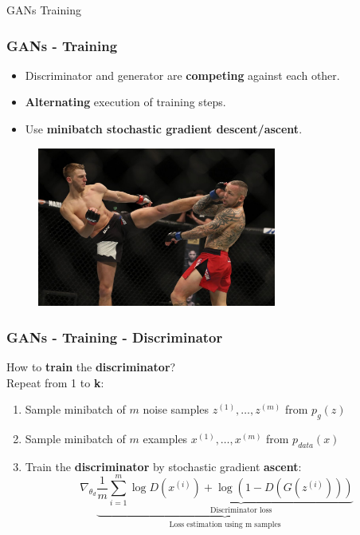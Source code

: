 \documentclass{beamer}
\begin{document}
\begin{frame}[standout]
	GANs Training
\end{frame}

\begin{frame}
	\frametitle{GANs - Training}
	\begin{itemize}
		\item Discriminator and generator are \textbf{competing} against each other.
		\item \textbf{Alternating} execution of training steps.
		\item Use \textbf{minibatch stochastic gradient descent/ascent}.
	\end{itemize}
	\begin{figure}
		\centering
		\includegraphics[width=0.7\textwidth]{images/fight.jpg}
	\end{figure}
\end{frame}

\begin{frame}
	\frametitle{GANs - Training - Discriminator}
	How to \textbf{train} the \textbf{discriminator}? \\
	Repeat from 1 to \textbf{k}:
		\begin{enumerate}
			\item Sample minibatch of $m$ noise samples ${z^{(1)},\dots,z^{(m)}}$ from $p_g(z)$
			\item Sample minibatch of $m$ examples ${x^{(1)},\dots,x^{(m)}}$ from $p_{data}(x)$
			\item Train the \textbf{discriminator} by stochastic gradient \textbf{ascent}:
		$$
			\nabla_{\theta_d} \underbrace{\frac{1}{m} \sum_{i=1}^{m} \underbrace{\log D(x^{(i)}) + \log(1 - D(G(z^{(i)})))}_{\text{Discriminator loss}}}_{\text{Loss estimation using m samples}}
		$$
		\end{enumerate}
\end{frame}
\end{document}
